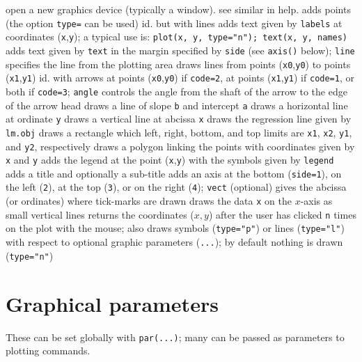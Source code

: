 	{open a new graphics device (typically a window). see similar in help.}
	{adds points (the option {\tt type=} can be used)}
	{ id. but with lines}
	{ adds text given by {\tt labels} at
    coordinates ({\tt x},{\tt y}); a typical use is: {\tt plot(x, y, type="n");
        text(x, y, names)}}
	{adds text given by {\tt text} in the margin specified by {\tt side} (see {\tt axis()} below); {\tt line} specifies the line from the plotting area}
	{ draws lines from points ({\tt x0},{\tt y0}) to points ({\tt x1},{\tt y1})}
	{id. with arrows at points ({\tt x0},{\tt y0}) if {\tt code=2}, at points ({\tt x1},{\tt y1}) if {\tt code=1}, or both if {\tt code=3}; {\tt angle} controls the angle from the shaft of the arrow to the edge of the arrow head}
	{draws a line of slope {\tt b} and intercept {\tt a}}
	{ draws a horizontal line at ordinate {\tt y}}
	{ draws a vertical line at abcissa {\tt x}}
	{ draws the regression line given by {\tt lm.obj}}
	{ draws a rectangle which left, right, bottom, and top limits are {\tt x1}, {\tt x2}, {\tt y1}, and {\tt y2}, respectively}
	{draws a polygon linking the points with coordinates given by {\tt x} and {\tt y}}
	{ adds the legend at the point ({\tt x},{\tt y}) with the symbols given by {\tt legend}}
	{ adds a title and optionally a sub-title}
	{adds an axis at the bottom ({\tt side=1}), on the left ({\tt 2}), at the top ({\tt 3}), or on the right ({\tt 4}); {\tt vect} (optional) gives the abcissa (or ordinates) where tick-marks are drawn}
	{draws the data {\tt x} on the $x$-axis as small vertical lines}
	{returns the coordinates ($x,y$) after the user has clicked {\tt n} times on the plot with the mouse; also draws symbols ({\tt type="p"}) or lines ({\tt type="l"}) with respect to optional graphic parameters ({\tt ...}); by default nothing is drawn ({\tt type="n"})}
\section{Graphical parameters}{}

These can be set globally with
{\tt par(...)}; many can be passed as
parameters to plotting commands.



